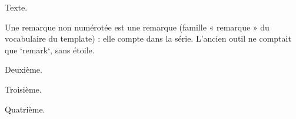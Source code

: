 Texte.

\begin{remark*} %
  Une remarque non numérotée est une remarque (famille « remarque » du
  vocabulaire du template) : elle compte dans la série. L'ancien outil ne
  comptait que `remark`, sans étoile.
\end{remark*}

\begin{remark}
  Deuxième.
\end{remark}

\begin{myremark*}
  Troisième.
\end{myremark*}

\begin{remark*}
  Quatrième.
\end{remark*}
